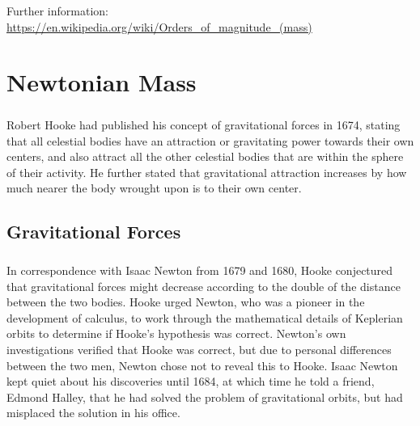 \documentclass{book}
\begin{document}
    Further information: \url{https://en.wikipedia.org/wiki/Orders_of_magnitude_(mass)}
    
    
    \chapter{Newtonian Mass}
    \label{ch:mass}
    \paragraph{}
    Robert Hooke had published his concept of gravitational forces in 1674, stating that all celestial bodies have an attraction or gravitating power towards their own centers, and also attract all the other celestial bodies that are within the sphere of their activity. He further stated that gravitational attraction increases by how much nearer the body wrought upon is to their own center.\cite{hooke1964attempt} 
    
    \section{Gravitational Forces}
    \label{sec:GravitationalForce}
    \paragraph{}
    In correspondence with Isaac Newton from 1679 and 1680, Hooke conjectured that gravitational forces might decrease according to the double of the distance between the two bodies.\cite{newton1961correspondence} Hooke urged Newton, who was a pioneer in the development of calculus, to work through the mathematical details of Keplerian orbits to determine if Hooke's hypothesis was correct. Newton's own investigations verified that Hooke was correct, but due to personal differences between the two men, Newton chose not to reveal this to Hooke. Isaac Newton kept quiet about his discoveries until 1684, at which time he told a friend, Edmond Halley, that he had solved the problem of gravitational orbits, but had misplaced the solution in his office.
\end{document}
